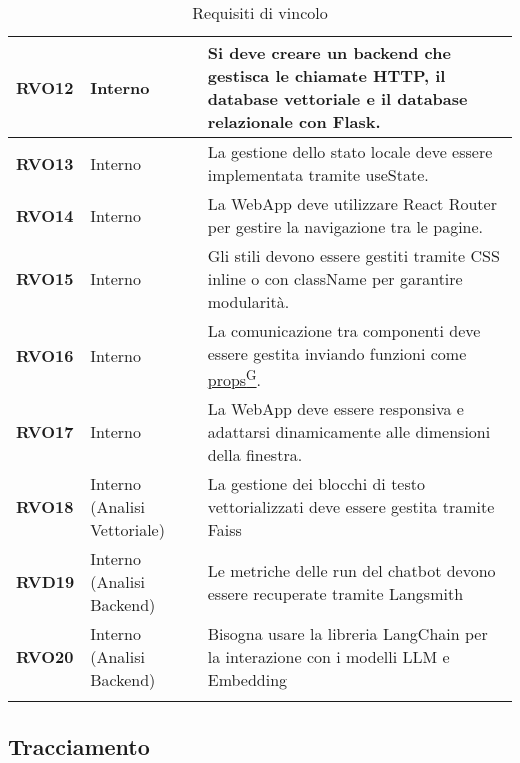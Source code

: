\begin{longtable}{|>{\centering\arraybackslash}m{}|>{\centering\arraybackslash}m{}|>{\centering\arraybackslash}m{}|}
	\hline
	\textbf{RVO12} & Interno & Si deve creare un backend che gestisca le chiamate HTTP, il database vettoriale e il database relazionale con Flask.\\
	\hline
	\textbf{RVO13} & Interno & La gestione dello stato locale deve essere implementata tramite useState.\\
	\hline
	\textbf{RVO14} & Interno & La WebApp deve utilizzare React Router per gestire la navigazione tra le pagine.\\
	\hline
	\textbf{RVO15} & Interno & Gli stili devono essere gestiti tramite CSS inline o con className per garantire modularità.\\
	\hline
	\textbf{RVO16} & Interno & La comunicazione tra componenti deve essere gestita inviando funzioni come \href{https://code7crusaders.github.io/docs/RTB/documentazione_interna/glossario.html#props}{props\textsuperscript{G}}.\\
	\hline
	\textbf{RVO17} & Interno & La WebApp deve essere responsiva e adattarsi dinamicamente alle dimensioni della finestra.\\
	\hline
	\textbf{RVO18} & Interno (Analisi Vettoriale) & La gestione dei blocchi di testo vettorializzati deve essere gestita tramite Faiss\\
	\hline
	\textbf{RVD19} & Interno (Analisi Backend) & Le metriche delle run del chatbot devono essere recuperate tramite Langsmith\\
	\hline
	\textbf{RVO20} & Interno (Analisi Backend) & Bisogna usare la libreria LangChain per la interazione con i modelli LLM e Embedding\\
	\hline
	\caption{Requisiti di vincolo}
\end{longtable}


\pagebreak
\subsection{Tracciamento}
